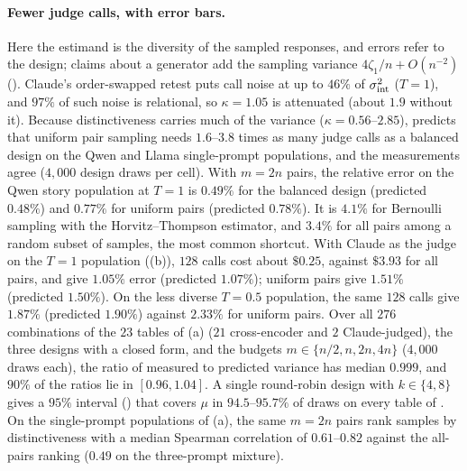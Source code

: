 \paragraph{Fewer judge calls, with error bars.} Here the estimand is
the diversity of the sampled responses, and errors refer to the design;
claims about a generator add the sampling variance $4\zeta_1/n+O(n^{-2})$
(). Claude's order-swapped retest puts call noise at up
to $46\%$ of $\sigma^2_{\mathrm{int}}$ ($T=1$), and $97\%$ of such noise is relational, so
$\kappa=1.05$ is attenuated (about $1.9$ without it). Because distinctiveness
carries much of the variance ($\kappa=0.56$--$2.85$),  predicts
that uniform pair sampling needs $1.6$--$3.8$ times as many judge calls as a
balanced design on the Qwen and Llama single-prompt populations, and the
measurements agree ($4{,}000$ design draws per cell). With $m=2n$ pairs, the
relative error on the Qwen story population at $T=1$ is $0.49\%$ for the
balanced design (predicted $0.48\%$) and $0.77\%$ for uniform pairs
(predicted $0.78\%$). It is $4.1\%$ for Bernoulli sampling with the
Horvitz--Thompson estimator, and $3.4\%$ for all pairs among a random subset
of samples, the most common shortcut. With Claude as the judge on the $T=1$
population ((b)), $128$ calls cost about $\$0.25$, against
$\$3.93$ for all pairs, and give $1.05\%$ error (predicted $1.07\%$);
uniform pairs give $1.51\%$ (predicted $1.50\%$). On the less diverse
$T=0.5$ population, the same $128$ calls give $1.87\%$ (predicted $1.90\%$)
against $2.33\%$ for uniform pairs. Over all $276$ combinations of the $23$ tables of (a) ($21$ cross-encoder and $2$ Claude-judged),
the three designs with a closed form, and the budgets $m\in\{n/2,n,2n,4n\}$ ($4{,}000$ draws each), the ratio of measured to predicted
variance has median $0.999$, and $90\%$ of the ratios lie in $[0.96,1.04]$.
A single round-robin design with $k\in\{4,8\}$ gives a
$95\%$ interval () that covers $\mu$ in $94.5$--$95.7\%$ of
draws on every table of . On the single-prompt populations of (a), the same $m=2n$ pairs
rank samples by distinctiveness with a median Spearman correlation of
$0.61$--$0.82$ against the all-pairs ranking ($0.49$ on the three-prompt
mixture).

